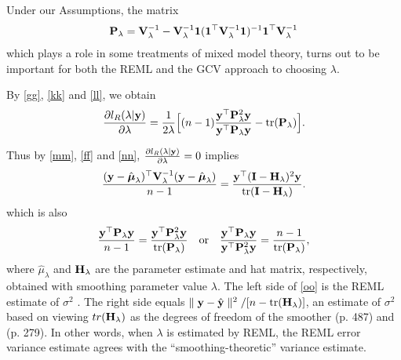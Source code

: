 \documentclass[article]{jss}
\begin{document}
\begin{appendix}
Under our Assumptions, the matrix
\begin{align*}
{\bf P}_\lambda={\bf V}_\lambda^{-1}-{\bf V}_\lambda^{-1}\mathbf{1}(\mathbf{1}^\top {\bf V}_\lambda^{-1}\mathbf{1})^{-1}\mathbf{1}^\top {\bf V}_\lambda^{-1}
\end{align*}
which plays a role in some treatments of mixed model theory, turns out to be important for both the REML and the GCV approach to choosing $\lambda$.

By \eqref{gg}, \eqref{kk} and \eqref{ll}, we obtain
\begin{align}
\frac{\partial l_R(\lambda|{\bf y})}{\partial \lambda}=\frac{1}{2\lambda}\Big[(n-1)\frac{{\bf y}^\top {\bf P}_\lambda^2{\bf y}}{{\bf y}^\top {\bf P}_\lambda {\bf y}}- \mbox{tr}({\bf P}_\lambda)\Big]. \label{nn}
\end{align}

Thus by \eqref{mm}, \eqref{ff} and \eqref{nn}, $\frac{\partial l_R(\lambda|{\bf y})}{\partial \lambda}=0$ implies
\begin{align}
\frac{({\bf y}-\hat{\boldsymbol{\mu}}_\lambda)^\top {\bf V}_\lambda^{-1}({\bf y}-\hat{\boldsymbol{\mu}}_\lambda)}{n-1}=\frac{{\bf y}^\top  ({\bf I}-{\bf H}_\lambda)^2{\bf y}}{\mbox{tr}({\bf I}-{\bf H}_\lambda)}. \label{oo}
\end{align}
which is also
\begin{align}
\frac{{\bf y}^\top {\bf P}_\lambda {\bf y}}{n-1}=\frac{{\bf y}^\top  {\bf P}_\lambda^2{\bf y}}{\mbox{tr}({\bf P}_\lambda)} \quad \mbox{or} \quad \frac{{\bf y}^\top {\bf P}_\lambda {\bf y}}{{\bf y}^\top  {\bf P}_\lambda^2{\bf y}}=\frac{n-1}{\mbox{tr}({\bf P}_\lambda)},
\end{align}
where $\hat{\mu}_\lambda$ and ${\bf H}_\lambda$ are the parameter estimate and hat matrix, respectively, obtained with smoothing parameter value $\lambda$. The left side of \eqref{oo} is the REML estimate of $\sigma^2$ \citep{wahba_spline_1990}. The right side equals $\parallel {\bf y}-\hat{{\bf y}}\parallel ^2/[n-\mbox{tr}({\bf H}_\lambda)]$, an estimate of $\sigma^2$ based on viewing $tr({\bf H}_\lambda)$ as the degrees of freedom of the smoother \citep{pawitan_all_2001}(p. 487) and \citep{lee_generalized_2006}(p. 279). In other words, when $\lambda$ is estimated by REML, the REML error variance estimate agrees with the ``smoothing-theoretic'' variance estimate.


\end{appendix}
\end{document}
